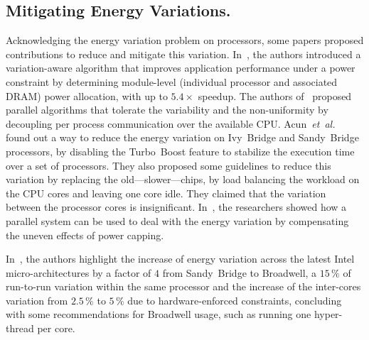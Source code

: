 \subsection{Mitigating Energy Variations.}
Acknowledging the energy variation problem on processors, some papers proposed contributions to reduce and mitigate this variation.
In~\cite{inadomi_analyzing_2015}, the authors introduced a variation-aware algorithm that improves application performance under a power constraint by determining module-level (individual processor and associated DRAM) power allocation, with up to $5.4\times$ speedup.
The authors of~\cite{hammouda_noise-tolerant_2015} proposed parallel algorithms that tolerate the variability and the non-uniformity by decoupling per process communication over the available CPU.
Acun~\emph{et~al.}~\cite{acun_variation_2016} found out a way to reduce the energy variation on Ivy~Bridge and Sandy~Bridge processors, by disabling the Turbo~Boost feature to stabilize the execution time over a set of processors.
They also proposed some guidelines to reduce this variation by replacing the old---slower---chips, by load balancing the workload on the CPU cores and leaving one core idle.
They claimed that the variation between the processor cores is insignificant.
In~\cite{chasapis_runtime-guided_2016}, the researchers showed how a parallel system can be used to deal with the energy variation by compensating the uneven effects of power capping.

In~\cite{marathe_empirical_2017_m}, the authors highlight the increase of energy variation across the latest Intel micro-architectures by a factor of $4$ from Sandy~Bridge to Broadwell, a $15\,\%$ of run-to-run variation within the same processor and the increase of the inter-cores variation from $2.5\,\%$ to $5\,\%$ due to hardware-enforced constraints, concluding with some recommendations for Broadwell usage, such as running one hyper-thread per core.





